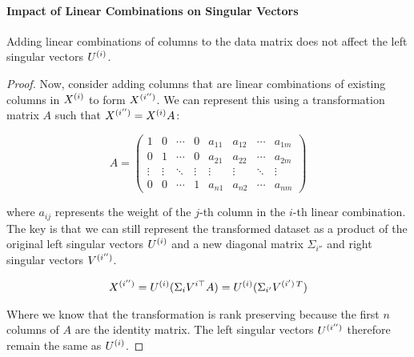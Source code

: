 \paragraph{Impact of Linear Combinations on Singular Vectors}

\begin{lemma}
    Adding linear combinations of columns to the data matrix does not affect the left singular vectors $U^{(i)}$.
\end{lemma}

\begin{proof}
    Now, consider adding columns that are linear combinations of existing columns in \( X^{(i)} \) to form \( X^{(i'')} \).
    We can represent this using a transformation matrix \( A \) such that \( X^{(i'')} = X^{(i)}A \):

    \begin{equation}
        A = \begin{pmatrix}
                1      & 0      & \cdots & 0      & a_{11} & a_{12} & \cdots & a_{1m} \\
                0      & 1      & \cdots & 0      & a_{21} & a_{22} & \cdots & a_{2m} \\
                \vdots & \vdots & \ddots & \vdots & \vdots & \vdots & \ddots & \vdots \\
                0      & 0      & \cdots & 1      & a_{n1} & a_{n2} & \cdots & a_{nm}
        \end{pmatrix}
    \end{equation}

    where \( a_{ij} \) represents the weight of the \( j \)-th column in the \( i \)-th linear combination.
    The key is that we can still represent the transformed dataset as a product of the original left singular vectors \( U^{(i)} \) and a new diagonal matrix \( \Sigma_{i''} \) and right singular vectors \( V^{(i'')} \).

    \begin{align}
        X^{(i'')} = U^{(i)}(\Sigma_{i}V^{i\top}A) = U^{(i)}(\Sigma_{i'}V^{(i')\,T})  \label{eq:svd_linear_combinations}
    \end{align}

    Where we know that the transformation is rank preserving because the first \( n \) columns of \( A \) are the identity matrix.
    The left singular vectors \( U^{(i'')} \) therefore remain the same as \( U^{(i)} \).
\end{proof}

